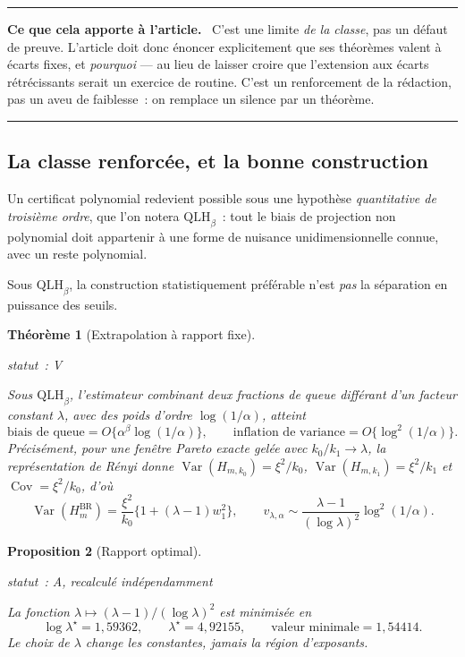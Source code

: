 \documentclass[11pt]{article}
\theoremstyle{plain}
\newtheorem{theoreme}{Théorème}[section]
\newtheorem{proposition}[theoreme]{Proposition}
\theoremstyle{definition}
\theoremstyle{remark}
\DeclareMathOperator{\Var}{Var}
\DeclareMathOperator{\Cov}{Cov}
\newcommand{\1}{\mathbf 1}
\newcommand{\statut}[1]{%
  \nopagebreak\par\nopagebreak
  \hfill{\normalfont\footnotesize\textcolor{gris}{statut~: #1}}%
  \par\nopagebreak\vspace{-2pt}}
\newenvironment{apport}
  {\par\medskip\noindent\begingroup\color{bleu}\rule{\linewidth}{0.6pt}\par
   \nobreak\vspace{2pt}\noindent\textbf{Ce que cela apporte à l'article.}\ \normalcolor}
  {\par\vspace{2pt}\noindent\textcolor{bleu}{\rule{\linewidth}{0.6pt}}\endgroup\par\medskip}
\begin{document}
\begin{apport}
C'est une limite \emph{de la classe}, pas un défaut de preuve. L'article
doit donc énoncer explicitement que ses théorèmes valent à écarts fixes,
et \emph{pourquoi} --- au lieu de laisser croire que l'extension aux
écarts rétrécissants serait un exercice de routine. C'est un
renforcement de la rédaction, pas un aveu de faiblesse~: on remplace un
silence par un théorème.
\end{apport}

\subsection{La classe renforcée, et la bonne construction}

Un certificat polynomial redevient possible sous une hypothèse
\emph{quantitative de troisième ordre}, que l'on notera $\mathrm{QLH}_\beta$~:
tout le biais de projection non polynomial doit appartenir à une forme de
nuisance unidimensionnelle connue, avec un reste polynomial.

Sous $\mathrm{QLH}_\beta$, la construction statistiquement préférable
n'est \emph{pas} la séparation en puissance des seuils.

\begin{theoreme}[Extrapolation à rapport fixe]
\label{thm:extrapolation}
\statut{V}
Sous $\mathrm{QLH}_\beta$, l'estimateur combinant deux fractions de queue
différant d'un \emph{facteur constant} $\lambda$, avec des poids d'ordre
$\log(1/\alpha)$, atteint
\[
 \text{biais de queue}=O\{\alpha^\beta\log(1/\alpha)\},
 \qquad
 \text{inflation de variance}=O\{\log^2(1/\alpha)\}.
\]
Précisément, pour une fenêtre Pareto exacte gelée avec
$k_0/k_1\to\lambda$, la représentation de Rényi donne
$\Var(H_{m,k_0})=\xi^2/k_0$, $\Var(H_{m,k_1})=\xi^2/k_1$ et
$\Cov=\xi^2/k_0$, d'où
\[
 \Var(H^{\mathrm{BR}}_m)=\frac{\xi^2}{k_0}\{1+(\lambda-1)w_1^2\},
 \qquad
 v_{\lambda,\alpha}\sim\frac{\lambda-1}{(\log\lambda)^2}\log^2(1/\alpha).
\]
\end{theoreme}

\begin{proposition}[Rapport optimal]
\label{prop:lambda}
\statut{A, recalculé indépendamment}
La fonction $\lambda\mapsto(\lambda-1)/(\log\lambda)^2$ est minimisée en
\[
 \log\lambda^\star=1{,}59362,\qquad
 \lambda^\star=4{,}92155,\qquad
 \text{valeur minimale}=1{,}54414 .
\]
Le choix de $\lambda$ change les constantes, jamais la région
d'exposants.
\end{proposition}
\end{document}
